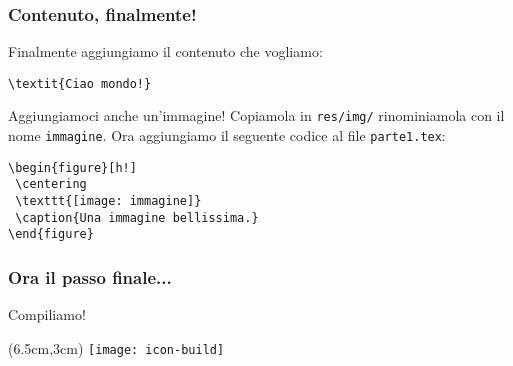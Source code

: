 \begin{frame}[fragile]
 
 \frametitle{Contenuto, finalmente!}
 
 Finalmente aggiungiamo il contenuto che vogliamo:
 
 \begin{lstlisting}[frame = single, title={File res/sections/parte1.tex}]
\textit{Ciao mondo!}
 \end{lstlisting}
 
 Aggiungiamoci anche un'immagine!
 Copiamola in \texttt{res/img/} rinominiamola con il nome \texttt{immagine}. 
Ora aggiungiamo il seguente codice al file \texttt{parte1.tex}:

 \begin{lstlisting}[frame = single]
\begin{figure}[h!]
 \centering
 \texttt{[image: immagine]}
 \caption{Una immagine bellissima.}
\end{figure}
 \end{lstlisting}


\end{frame}

\begin{frame}
 \frametitle{Ora il passo finale...}
 
 \huge Compiliamo!
 
 
 \begin{textblock*}{5cm}(6.5cm,3cm)
   \texttt{[image: icon-build]}
 \end{textblock*}
\end{frame}
